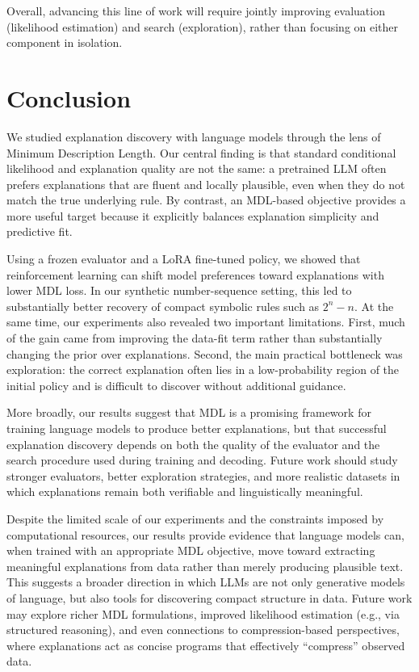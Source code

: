 \documentclass{article}
\theoremstyle{plain}
\theoremstyle{definition}
\theoremstyle{remark}
\begin{document}
Overall, advancing this line of work will require jointly improving evaluation (likelihood estimation) and search (exploration), rather than focusing on either component in isolation.

\section{Conclusion}

We studied explanation discovery with language models through the lens of Minimum Description Length. Our central finding is that standard conditional likelihood and explanation quality are not the same: a pretrained LLM often prefers explanations that are fluent and locally plausible, even when they do not match the true underlying rule. By contrast, an MDL-based objective provides a more useful target because it explicitly balances explanation simplicity and predictive fit.

Using a frozen evaluator and a LoRA fine-tuned policy, we showed that reinforcement learning can shift model preferences toward explanations with lower MDL loss. In our synthetic number-sequence setting, this led to substantially better recovery of compact symbolic rules such as $2^n-n$. At the same time, our experiments also revealed two important limitations. First, much of the gain came from improving the data-fit term rather than substantially changing the prior over explanations. Second, the main practical bottleneck was exploration: the correct explanation often lies in a low-probability region of the initial policy and is difficult to discover without additional guidance.

More broadly, our results suggest that MDL is a promising framework for training language models to produce better explanations, but that successful explanation discovery depends on both the quality of the evaluator and the search procedure used during training and decoding. Future work should study stronger evaluators, better exploration strategies, and more realistic datasets in which explanations remain both verifiable and linguistically meaningful.

Despite the limited scale of our experiments and the constraints imposed by computational resources, our results provide evidence that language models can, when trained with an appropriate MDL objective, move toward extracting meaningful explanations from data rather than merely producing plausible text. This suggests a broader direction in which LLMs are not only generative models of language, but also tools for discovering compact structure in data. Future work may explore richer MDL formulations, improved likelihood estimation (e.g., via structured reasoning), and even connections to compression-based perspectives, where explanations act as concise programs that effectively ``compress'' observed data.
\end{document}
